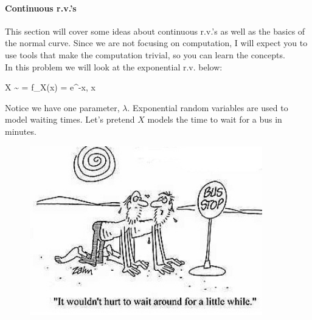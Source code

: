 \documentclass[12pt]{article}
\begin{document}
\paragraph{Continuous r.v.'s} This section will cover some ideas about continuous r.v.'s as well as the basics of the normal curve. Since we are not focusing on computation, I will expect you to use tools that make the computation trivial, so you can learn the concepts. \\

\problem In this problem we will look at the exponential r.v. below:

\beqn
X \sim \exponential{\lambda} = f_X(x) = \lambda e^{-\lambda x}, \quad x 
\eeqn

Notice we have one parameter, $\lambda$. Exponential random variables are used to model waiting times. Let's pretend $X$ models the time to wait for a bus in minutes. 



\begin{figure}[htp]
\centering
\includegraphics[width=4in, height=2.9in]{busstop.jpg}
\end{figure}
\FloatBarrier
\end{document}
